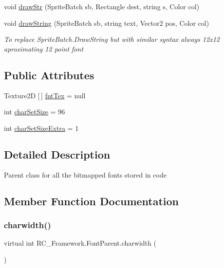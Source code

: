 \begin{DoxyCompactItemize}
void \mbox{\hyperlink{class_r_c___framework_1_1_font_parent_a4579edb7593917664d9d9d323a29cbae}{draw\+Str}} (Sprite\+Batch sb, Rectangle dest, string s, Color col)
\item 
void \mbox{\hyperlink{class_r_c___framework_1_1_font_parent_a8a6df4d62966f52f689d5a9738325797}{draw\+String}} (Sprite\+Batch sb, string text, Vector2 pos, Color col)
\begin{DoxyCompactList}\small\item\em To replace Sprite\+Batch.\+Draw\+String but with similar syntax always 12x12 aproximating 12 point font \end{DoxyCompactList}\end{DoxyCompactItemize}
\subsection*{Public Attributes}
\begin{DoxyCompactItemize}
\item 
Texture2D \mbox{[}$\,$\mbox{]} \mbox{\hyperlink{class_r_c___framework_1_1_font_parent_aa4656447cdf3ab637f839e814cdadaea}{fnt\+Tex}} = null
\item 
int \mbox{\hyperlink{class_r_c___framework_1_1_font_parent_a86ed779120a31be51fe4a70a29e50ef4}{char\+Set\+Size}} = 96
\item 
int \mbox{\hyperlink{class_r_c___framework_1_1_font_parent_acb860508d110915f5146e2554d115818}{char\+Set\+Size\+Extra}} = 1
\end{DoxyCompactItemize}


\subsection{Detailed Description}
Parent class for all the bitmapped fonts stored in code 



\subsection{Member Function Documentation}
\mbox{\label{class_r_c___framework_1_1_font_parent_af32d5427b8feea59eb6f303ac3c36516}} 
\subsubsection{\texorpdfstring{charwidth()}{charwidth()}}
{\footnotesize\ttfamily virtual int R\+C\+\_\+\+Framework.\+Font\+Parent.\+charwidth (\begin{DoxyParamCaption}{ }\end{DoxyParamCaption})\hspace{0.3cm}{\ttfamily [virtual]}}



